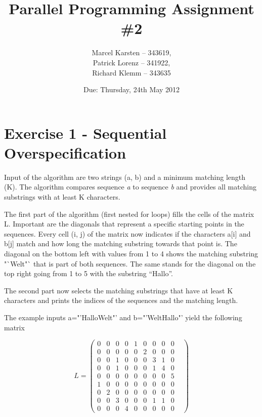 \documentclass[a4paper,twoside,11pt]{article}
\begin{document}
\pagestyle{fancyplain}

\title{Parallel Programming Assignment \#2} 
\author{Marcel Karsten -- 343619,\\ Patrick Lorenz -- 341922,\\ Richard Klemm -- 343635 }
\date{Due: Thursday, 24th May 2012} %
\maketitle

\lhead{}
\renewcommand{\headrulewidth}{0px}



\section{Exercise 1 - Sequential Overspecification}
Input of the algorithm are two strings (a, b) and a minimum matching length (K). The algorithm compares sequence \textit{a} to sequence \textit{b} and provides all matching substrings with at least K characters.

The first part of the algorithm (first nested for loops) fills the cells of the matrix L. Important are the diagonals that represent a specific starting points in the sequences. Every cell (i, j) of the matrix now indicates if the characters a[i] and b[j] match and how long the matching substring towards that point is. The diagonal on the bottom left with values from 1 to 4 shows the matching substring "`Welt"` that is part of both sequences. The same stands for the diagonal on the top right going from 1 to 5 with the substring "`Hallo"'.

The second part now selects the matching substrings that have at least K characters and prints the indices of the sequences and the matching length.


The example inputs a="'HalloWelt"' and b="'WeltHallo"' yield the following matrix 

$$L=
\begin{pmatrix}
	0 & 0 & 0 & 0 & 1 & 0 & 0 & 0 & 0 & \\
	0 & 0 & 0 & 0 & 0 & 2 & 0 & 0 & 0 & \\
	0 & 0 & 1 & 0 & 0 & 0 & 3 & 1 & 0 & \\
	0 & 0 & 1 & 0 & 0 & 0 & 1 & 4 & 0 & \\
	0 & 0 & 0 & 0 & 0 & 0 & 0 & 0 & 5 & \\
	1 & 0 & 0 & 0 & 0 & 0 & 0 & 0 & 0 & \\
	0 & 2 & 0 & 0 & 0 & 0 & 0 & 0 & 0 & \\
	0 & 0 & 3 & 0 & 0 & 0 & 1 & 1 & 0 & \\
	0 & 0 & 0 & 4 & 0 & 0 & 0 & 0 & 0 &
\end{pmatrix}
$$
\end{document}
